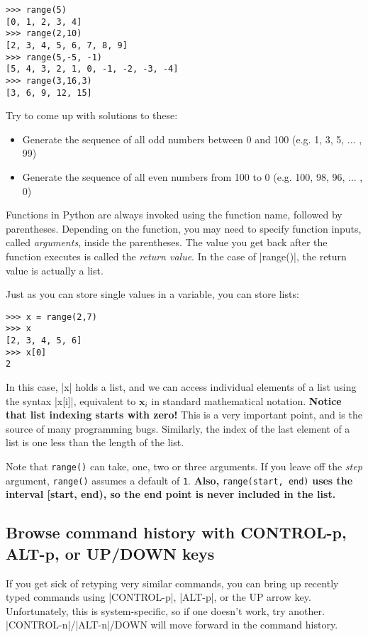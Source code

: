 \documentclass{article}
\begin{document}
\begin{Verbatim}
>>> range(5)
[0, 1, 2, 3, 4]
>>> range(2,10)
[2, 3, 4, 5, 6, 7, 8, 9]
>>> range(5,-5, -1)
[5, 4, 3, 2, 1, 0, -1, -2, -3, -4]
>>> range(3,16,3)
[3, 6, 9, 12, 15]
\end{Verbatim}

Try to come up with solutions to these:
\begin{itemize}
 \item Generate the sequence of all odd numbers between 0 and 100 (e.g. 1, 3, 5,
... , 99)
 \item Generate the sequence of all even numbers from 100 to 0 (e.g. 100, 98,
96, ... , 0)
\end{itemize}

Functions in Python are always invoked using the function name, followed by parentheses.  Depending on the function, you may need to specify
function inputs, called \textit{arguments}, inside the parentheses.  The value you get back after the function executes is
called the \textit{return value}.  In the case of |range()|, the return value is actually a list.

\pagebreak

Just as you can store single values in a variable, you can store lists:

\begin{Verbatim}
>>> x = range(2,7)
>>> x
[2, 3, 4, 5, 6]
>>> x[0]
2
\end{Verbatim}

In this case, |x| holds a list, and we can access individual elements of a list
using the syntax |x[i]|, equivalent to $\textbf{x}_{i}$ in standard mathematical
notation.  \textbf{Notice that list indexing starts with zero!}  This is a very
important point, and is the source of many programming bugs.  Similarly, the
index of the last element of a list is one less than the length of the list.

Note that \texttt{range()} can take, one, two or three arguments.  If you leave
off the \textit{step} argument, \texttt{range()} assumes a default of
\texttt{1}.  \textbf{Also,} \texttt{range(start, end)} \textbf{uses the interval
[start, end), so the end point is never included in the list.}

\subsection{Browse command history with CONTROL-p, ALT-p, or UP/DOWN keys}
If you get sick of retyping very similar commands, you can bring up recently
typed commands using |CONTROL-p|, |ALT-p|, or the UP arrow key.  Unfortunately,
this is system-specific, so if one doesn't work, try another.  |CONTROL-n|/|ALT-n|/DOWN will move
forward in the command history.
\end{document}
